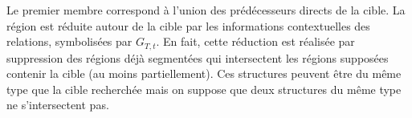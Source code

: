 % 

	Le premier membre correspond à l'union des prédécesseurs directs de la cible. La région est réduite autour de la cible par les informations contextuelles des relations, symbolisées par $G_{T,t}$. En fait, cette réduction est réalisée par suppression des régions déjà segmentées qui intersectent les régions supposées contenir la cible (au moins partiellement). Ces structures peuvent être du même type que la cible recherchée mais on suppose que deux structures du même type ne s'intersectent pas.

